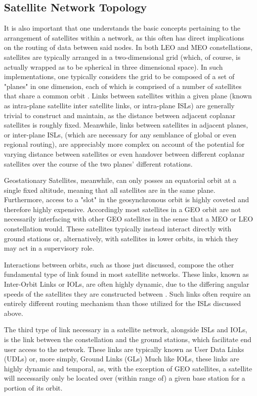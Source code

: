 \subsection{Satellite Network Topology}\label{subsec:satelliteNetworkTopology}
It is also important that one understands the basic concepts pertaining to the arrangement of satellites within a network, as this often has direct implications on the routing of data between said nodes. In both LEO and MEO constellations, satellites are typically arranged in a two-dimensional grid (which, of course, is actually wrapped as to be spherical in three dimensional space). In such implementations, one typically considers the grid to be composed of a set of "planes" in one dimension, each of which is comprised of a number of satellites that share a common orbit \cite{xiaogang_survey_2016}. Links between satellites within a given plane (known as intra-plane satellite inter satellite links, or intra-plane ISLs) are generally trivial to construct and maintain, as the distance between adjacent coplanar satellites is roughly fixed. Meanwhile, links between satellites in adjacent planes, or inter-plane ISLs, (which are necessary for any semblance of global or even regional routing), are appreciably more complex on account of the potential for varying distance between satellites or even handover between different coplanar satellites over the course of the two planes' different rotations.

Geostationary Satellites, meanwhile, can only posses an equatorial orbit at a single fixed altitude, meaning that all satellites are in the same plane. Furthermore, access to a "slot" in the geosynchronous orbit is highly coveted and therefore highly expensive. Accordingly most satellites in a GEO orbit are not necessarily interfacing with other GEO satellites in the sense that a MEO or LEO constellation would. These satellites typically instead interact directly with ground stations or, alternatively, with satellites in lower orbits, in which they may act in a supervisory role.

Interactions between orbits, such as those just discussed, compose the other fundamental type of link found in most satellite networks. These links, known as Inter-Orbit Links or IOLs, are often highly dynamic, due to the differing angular speeds of the satellites they are constructed between \cite{xiaogang_survey_2016}. Such links often require an entirely different routing mechanism than those utilized for the ISLs discussed above.

The third type of link necessary in a satellite network, alongside ISLs and IOLs, is the link between the constellation and the ground stations, which facilitate end user access to the network. These links are typically known as User Data Links (UDLs) or, more simply, Ground Links (GLs) \cite{xiaogang_survey_2016} Much like IOLs, these links are highly dynamic and temporal, as, with the exception of GEO satellites, a satellite will necessarily only be located over (within range of) a given base station for a portion of its orbit.